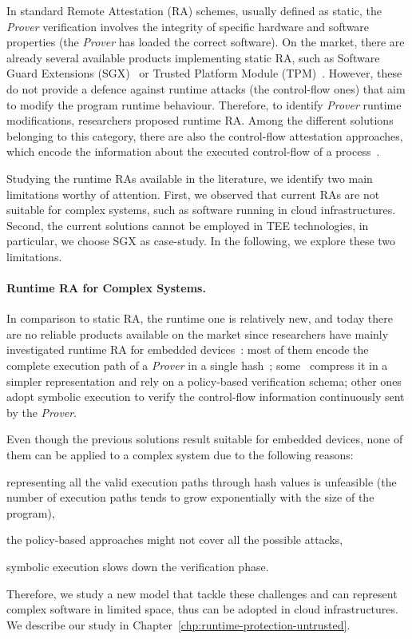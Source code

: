 In standard Remote Attestation (RA) schemes, usually defined as static, the 
\emph{Prover} verification involves the integrity of specific hardware and 
software properties (\eg the \emph{Prover} has loaded the correct software).
On the market, there are already several available products implementing 
static RA, such as Software Guard Extensions (SGX)~\citep{costan2016intel} or 
Trusted Platform Module (TPM)~\citep{tomlinson2017introduction}.
However, these do not provide a defence against runtime attacks (\eg the 
control-flow ones) that aim to modify the program runtime behaviour. 
Therefore, to identify \emph{Prover} runtime modifications, researchers 
proposed runtime RA. Among the different solutions belonging to this category, 
there are also the control-flow attestation approaches, which
encode the information about the executed control-flow of a 
process~\citep{abera2016c,aberadiat}.

Studying the runtime RAs available in the literature, we identify two main 
limitations worthy of attention. 
First, we observed that current RAs are not suitable for complex systems, such 
as software running in cloud infrastructures.
Second, the current solutions cannot be employed in TEE technologies, in 
particular, we choose SGX as case-study.
In the following, we explore these two limitations.

\paragraph{Runtime RA for Complex Systems.} 

In comparison to static RA, the runtime one is relatively new, and today there 
are no reliable products available on the market since researchers have mainly 
investigated runtime RA for embedded 
devices~\citep{abera2016c,zeitouni2017atrium,aberadiat,dessouky2017fat,Dessouky:2018:LLH:3240765.3240821}:
most of them encode the complete execution path of a \emph{Prover} in a single 
hash~\citep{abera2016c,zeitouni2017atrium,dessouky2017fat}; 
some~\citep{aberadiat} compress it in a simpler representation and rely on a 
policy-based verification schema; 
other ones~\citep{Dessouky:2018:LLH:3240765.3240821} adopt symbolic execution 
to verify the control-flow information continuously sent by the \emph{Prover}.

Even though the previous solutions result suitable for embedded devices, none 
of them can be applied to a complex system due to the following reasons: 
\begin{enumerate*}[label=(\roman*)]
	\item representing all the valid execution paths through hash values is 
	unfeasible (\eg the number of execution paths tends to grow exponentially 
	with the size of the program),
	\item the policy-based approaches might not cover all the possible attacks,
	\item symbolic execution slows down the verification phase.
\end{enumerate*}
Therefore, we study a new model that tackle these challenges and can represent 
complex software in limited space, thus can be adopted in cloud 
infrastructures. 
We describe our study in Chapter~\ref{chp:runtime-protection-untrusted}.


